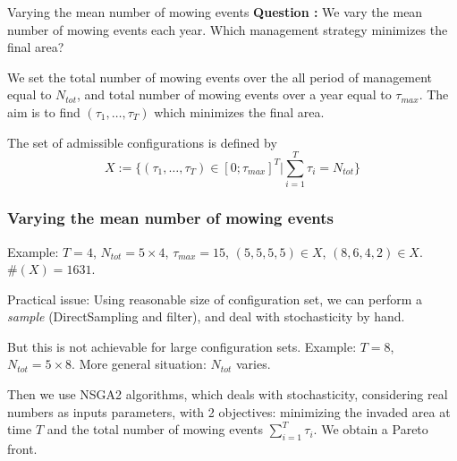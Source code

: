 \documentclass{myBeamer}
\begin{document}
	
\backupbegin



\begin{frame}{Varying the mean number of mowing events}
\textbf{Question :} We vary the mean number of mowing events each year. Which management strategy minimizes the final area?

\bigbreak 
We set the total number of mowing events over the all period of management equal to  $N_{tot}$, and total number of mowing events over a year equal to  $\tau_{max}$.
The aim is to find $( \tau_1, \ldots , \tau_T)$ which minimizes the final area.

\bigbreak 
The set of admissible configurations is defined by
\[ X := \{ ( \tau_1, \ldots , \tau_T) \in [ 0 ; \tau_{max}]^T  | \sum_{i=1}^{T} \tau_i = N_{tot} \} \]

\end{frame}



\begin{frame}%
\frametitle{Varying the mean number of mowing events}

\smallbreak
Example: $T=4$, $N_{tot} = 5 \times 4$, $\tau_{max} = 15 $,  $(5,5,5,5) \in X$, $(8,6,4,2) \in X$.  $ \#(X) = 1631$.

\bigbreak 
Practical issue: Using reasonable size of configuration set, we can perform a \textit{sample} (DirectSampling and filter), and deal with stochasticity by hand.

\pause
\smallbreak  %
But this is not achievable for large configuration sets.
\smallbreak
Example: $T=8$, $N_{tot} = 5 \times 8$. %
\smallbreak
\pause
More general situation: $N_{tot}$ varies. %

Then we use NSGA2 algorithms, which deals with stochasticity, considering real numbers as inputs parameters, with 2 objectives: minimizing the invaded area at time $T$ and the total number of mowing events $\sum_{i=1}^{T} \tau_i$. We obtain a Pareto front.  
  
\end{frame}
\end{document}
